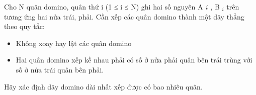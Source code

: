 Cho N quân domino, quân thứ i (1 ≤ i ≤ N) ghi hai số nguyên A $_ ­i $ , B $_ i $ trên tương ứng hai nửa trái, phải. Cần xếp các quân domino thành một dãy thẳng theo quy tắc:
\begin{itemize}
	\item Không xoay hay lật các quân domino
	\item Hai quân domino xếp kề nhau phải có số ở nửa phải quân bên trái trùng với số ở nửa trái quân bên phải.
\end{itemize}

Hãy xác định dãy domino dài nhất xếp được có bao nhiêu quân.

\
